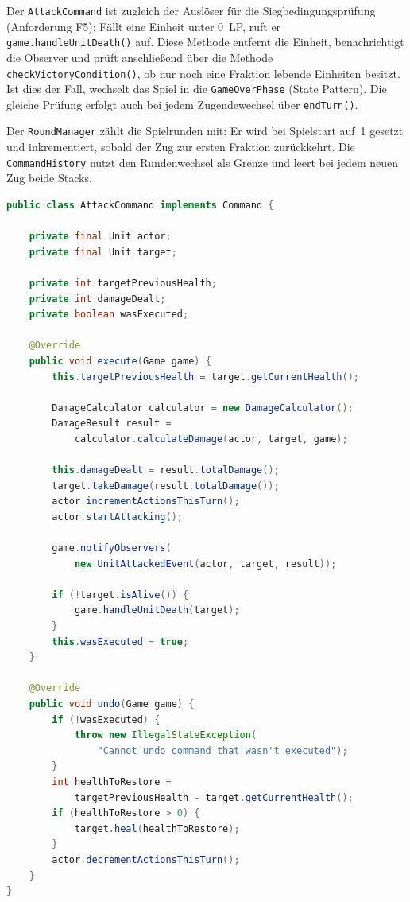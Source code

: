 Der \texttt{AttackCommand} ist zugleich der Auslöser für die Siegbedingungsprüfung (Anforderung F5): Fällt eine Einheit unter 0~LP,
ruft er \texttt{game.handleUnitDeath()} auf. Diese Methode entfernt die Einheit, benachrichtigt die Observer und prüft
anschließend über die Methode \texttt{checkVictoryCondition()}, ob nur noch eine Fraktion lebende Einheiten besitzt. Ist
dies der Fall, wechselt das Spiel in die \texttt{GameOverPhase} (State Pattern). Die gleiche Prüfung erfolgt auch bei
jedem Zugendewechsel über \texttt{endTurn()}.

Der \texttt{RoundManager} zählt die Spielrunden mit: Er wird bei Spielstart auf~1 gesetzt und inkrementiert, sobald der Zug
zur ersten Fraktion zurückkehrt. Die \texttt{CommandHistory} nutzt den Rundenwechsel als Grenze und leert bei jedem neuen Zug beide Stacks.

\newpage
\begin{lstlisting}[language=Java, caption={AttackCommand -- execute() und undo()}, label={lst:attack-command}]
public class AttackCommand implements Command {

    private final Unit actor;
    private final Unit target;

    private int targetPreviousHealth;
    private int damageDealt;
    private boolean wasExecuted;

    @Override
    public void execute(Game game) {
        this.targetPreviousHealth = target.getCurrentHealth();

        DamageCalculator calculator = new DamageCalculator();
        DamageResult result =
            calculator.calculateDamage(actor, target, game);

        this.damageDealt = result.totalDamage();
        target.takeDamage(result.totalDamage());
        actor.incrementActionsThisTurn();
        actor.startAttacking();

        game.notifyObservers(
            new UnitAttackedEvent(actor, target, result));

        if (!target.isAlive()) {
            game.handleUnitDeath(target);
        }
        this.wasExecuted = true;
    }

    @Override
    public void undo(Game game) {
        if (!wasExecuted) {
            throw new IllegalStateException(
                "Cannot undo command that wasn't executed");
        }
        int healthToRestore =
            targetPreviousHealth - target.getCurrentHealth();
        if (healthToRestore > 0) {
            target.heal(healthToRestore);
        }
        actor.decrementActionsThisTurn();
    }
}
\end{lstlisting}


